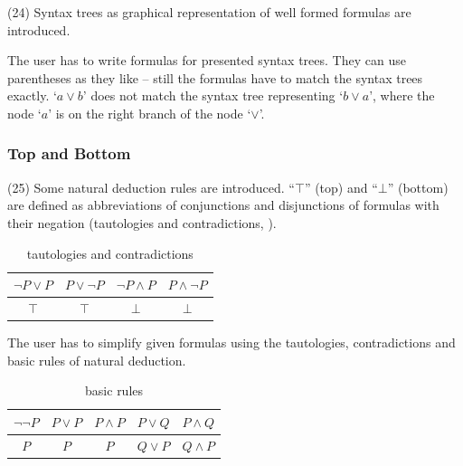 (24) Syntax trees as graphical representation of well formed formulas are introduced. 

The user has to write formulas for presented syntax trees. They can use parentheses as they like – still the formulas have to match the syntax trees exactly. ‘$a \vee b$’ does not match the syntax tree representing ‘$b \vee a$’, where the node ‘$a$’ is on the right branch of the node ‘$\vee$’.

\subsubsection{Top and Bottom}
\label{tut:25}

(25) Some natural deduction rules are introduced. 
“$\top$” (top) and “$ \bot$” (bottom) are defined
as abbreviations of conjunctions and disjunctions 
of formulas with their negation (tautologies and contradictions, ).

\begin{table}[htdp]
\begin{center}
\begin{tabular}{c|c|c|c}
$\neg P \vee P$&$P \vee \neg P$  & $\neg P \wedge P$ & $P \wedge \neg P$ \\
\hline
$\top$ & $\top$ & $ \bot$&$ \bot$\\
\end{tabular}
\caption{tautologies and contradictions}
\label{tab:TopBottom}
\end{center}
\end{table}

The user has to simplify given formulas using the tautologies, contradictions and basic rules of natural deduction.


%
%
%
\begin{table}[htdp]
\begin{center}
\begin{tabular}{c|c|c|c|c}
$\neg \neg P$ & $P \vee P$ & $P \wedge P$ & $P \vee Q$ & $P \wedge Q$\\
\hline
$P$ & $P$ & $P$ & $Q \vee P$ & $Q \wedge P$\\
\end{tabular}
\caption{basic rules}
\label{tab:BasicRules}
\end{center}
\end{table}
%

